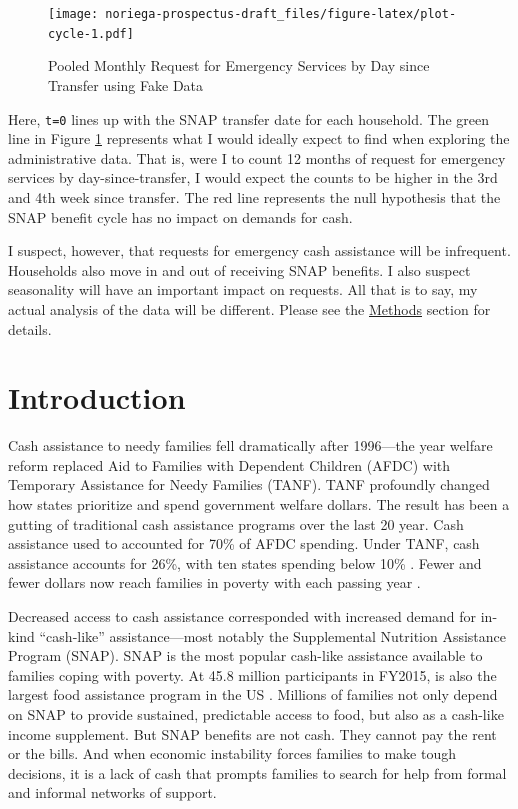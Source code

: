 \documentclass[12pt,letterpaperpaper,]{book}
\begin{document}
\begin{figure}
\centering
\texttt{[image: noriega-prospectus-draft\_files/figure-latex/plot-cycle-1.pdf]}
\caption{\label{fig:plot-cycle}Pooled Monthly Request for Emergency Services
by Day since Transfer using Fake Data}
\end{figure}

Here, \texttt{t=0} lines up with the SNAP transfer date for each
household. The green line in Figure \ref{fig:plot-cycle} represents what
I would ideally expect to find when exploring the administrative data.
That is, were I to count 12 months of request for emergency services by
day-since-transfer, I would expect the counts to be higher in the 3rd
and 4th week since transfer. The red line represents the null hypothesis
that the SNAP benefit cycle has no impact on demands for cash.

I suspect, however, that requests for emergency cash assistance will be
infrequent. Households also move in and out of receiving SNAP benefits.
I also suspect seasonality will have an important impact on requests.
All that is to say, my actual analysis of the data will be different.
Please see the \protect\hyperlink{methods-3}{Methods} section for
details.

\section*{Introduction}\label{introduction}

Cash assistance to needy families fell dramatically after 1996---the
year welfare reform replaced Aid to Families with Dependent Children
(AFDC) with Temporary Assistance for Needy Families (TANF). TANF
profoundly changed how states prioritize and spend government welfare
dollars. The result has been a gutting of traditional cash assistance
programs over the last 20 year. Cash assistance used to accounted for
70\% of AFDC spending. Under TANF, cash assistance accounts for 26\%,
with ten states spending below 10\% \citep{schott_how_2015}. Fewer and
fewer dollars now reach families in poverty with each passing year
\citep{cbpp_chart_2016}.

Decreased access to cash assistance corresponded with increased demand
for in-kind ``cash-like'' assistance---most notably the Supplemental
Nutrition Assistance Program (SNAP). SNAP is the most popular cash-like
assistance available to families coping with poverty. At 45.8 million
participants in FY2015, is also the largest food assistance program in
the US \citep{usda_fns_supplemental_2016}. Millions of families not only
depend on SNAP to provide sustained, predictable access to food, but
also as a cash-like income supplement. But SNAP benefits are not cash.
They cannot pay the rent or the bills. And when economic instability
forces families to make tough decisions, it is a lack of cash that
prompts families to search for help from formal and informal networks of
support.
\end{document}
